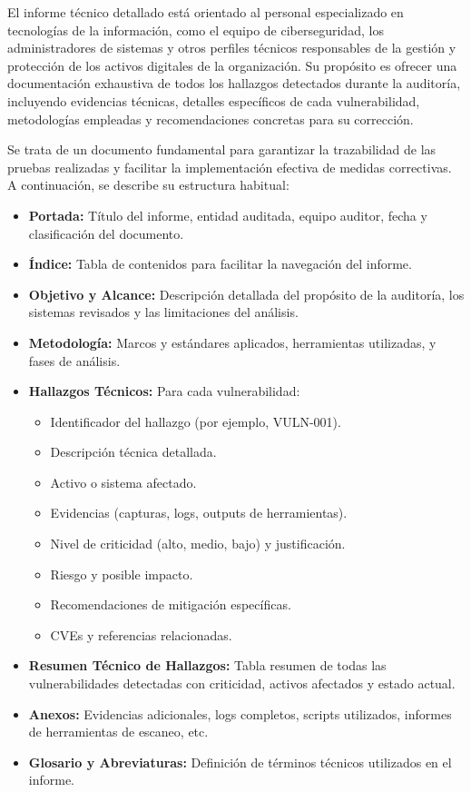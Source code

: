 \documentclass[a4paper, 11pt]{article}
\begin{document}
El informe técnico detallado está orientado al personal especializado en tecnologías de la información, como el equipo de ciberseguridad, los administradores de sistemas y otros perfiles técnicos responsables de la gestión y protección de los activos digitales de la organización. Su propósito es ofrecer una documentación exhaustiva de todos los hallazgos detectados durante la auditoría, incluyendo evidencias técnicas, detalles específicos de cada vulnerabilidad, metodologías empleadas y recomendaciones concretas para su corrección. 
\vspace{0.5cm}

Se trata de un documento fundamental para garantizar la trazabilidad de las pruebas realizadas y facilitar la implementación efectiva de medidas correctivas. A continuación, se describe su estructura habitual:

\begin{itemize}
  \item \textbf{Portada:} Título del informe, entidad auditada, equipo auditor, fecha y clasificación del documento.
  \item \textbf{Índice:} Tabla de contenidos para facilitar la navegación del informe.
  \item \textbf{Objetivo y Alcance:} Descripción detallada del propósito de la auditoría, los sistemas revisados y las limitaciones del análisis.
  \item \textbf{Metodología:} Marcos y estándares aplicados, herramientas utilizadas, y fases de análisis.
  \item \textbf{Hallazgos Técnicos:} Para cada vulnerabilidad:
  \begin{itemize}
    \item Identificador del hallazgo (por ejemplo, VULN-001).
    \item Descripción técnica detallada.
    \item Activo o sistema afectado.
    \item Evidencias (capturas, logs, outputs de herramientas).
    \item Nivel de criticidad (alto, medio, bajo) y justificación.
    \item Riesgo y posible impacto.
    \item Recomendaciones de mitigación específicas.
    \item CVEs y referencias relacionadas.
  \end{itemize}
  \item \textbf{Resumen Técnico de Hallazgos:} Tabla resumen de todas las vulnerabilidades detectadas con criticidad, activos afectados y estado actual.
  \item \textbf{Anexos:} Evidencias adicionales, logs completos, scripts utilizados, informes de herramientas de escaneo, etc.
  \item \textbf{Glosario y Abreviaturas:} Definición de términos técnicos utilizados en el informe.
\end{itemize}
\end{document}

